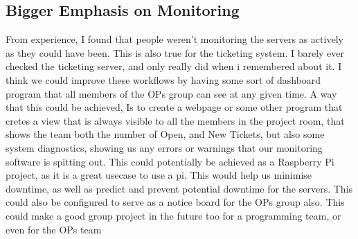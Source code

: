\documentclass{article}
\begin{document}
\subsection{Bigger Emphasis on Monitoring}
From experience, I found that people weren't monitoring the servers as actively as they could have been. This is also true for the ticketing system. I barely ever
checked the ticketing server, and only really did when i remembered about it. I think we could improve these workflows by having some sort of dashboard program that
all members of the OPs group can see at any given time. A way that this could be achieved, Is to create a webpage or some other program that cretes a view that is 
always visible to all the members in the project room, that shows the team both the number of Open, and New Tickets, but also some system diagnostics, showing us
any errors or warnings that our monitoring software is spitting out. This could potentially be achieved as a Raspberry Pi project, as it is a great usecase to use a 
pi. This would help us minimise downtime, as well as predict and prevent potential downtime for the servers. This could also be configured to serve as a notice
board for the OPs group also. This could make a good group project in the future too for a programming team, or even for the OPs team
\end{document}
